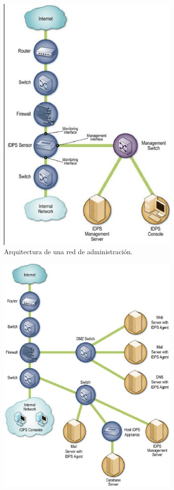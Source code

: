 	
\begin{figure}
\centering
\begin{subfigure}{.5\textwidth}
  \centering
  \includegraphics[scale=.7]{images/red_admon}
  \caption{Arquitectura de una red de administración.}
  \label{fig:red_admon}
\end{subfigure}%
\begin{subfigure}{.5\textwidth}
  \centering
  \includegraphics[scale=.55]{images/interfaz_admon}

\end{subfigure}
\end{figure}
